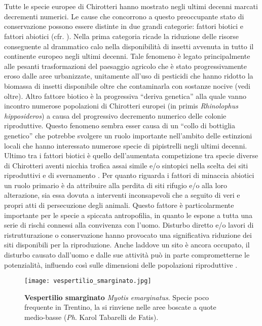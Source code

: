 \documentclass[10pt,twoside,openany,x11names,svgnames,italian,a5paper,dvipsnames,table]{memoir}
\newcommand{\ph}{\emph{Ph}. }
\begin{document}
\section*{}
Tutte le specie europee di Chirotteri hanno mostrato negli ultimi decenni marcati decrementi numerici. Le cause che concorrono a questo preoccupante stato di conservazione possono essere distinte in due grandi categorie: fattori biotici e fattori abiotici (cfr. \cite{Lanza} \cite{Kunz} \cite{Dietz}). Nella prima categoria ricade la riduzione delle risorse conseguente al drammatico calo nella disponibilità di insetti avvenuta in tutto il continente europeo negli ultimi decenni. Tale fenomeno è legato principalmente alle pesanti trasformazioni del paesaggio agricolo che è stato progressivamente eroso dalle aree urbanizzate, unitamente all’uso di pesticidi che hanno ridotto la biomassa di insetti disponibile oltre che contaminarla con sostanze nocive (vedi oltre). Altro fattore biotico è la progressiva “deriva genetica” alla quale vanno incontro numerose popolazioni di Chirotteri europei (in primis \emph{Rhinolophus hipposideros}) a causa del progressivo decremento numerico delle colonie riproduttive. Questo fenomeno sembra esser causa di un “collo di bottiglia genetico” che potrebbe svolgere un ruolo importante nell’ambito delle estinzioni locali che hanno interessato numerose specie di pipistrelli negli ultimi decenni. Ultimo tra i fattori biotici è quello dell’aumentata competizione tra specie diverse di Chirotteri aventi nicchia trofica assai simile e/o sintopici nella scelta dei siti riproduttivi e di svernamento \cite{Arlettaz}. Per quanto riguarda i fattori di minaccia abiotici un ruolo primario è da attribuire alla perdita di siti rifugio e/o alla loro alterazione, sia essa dovuta a interventi inconsapevoli che a seguito di veri e propri atti di persecuzione degli animali. Questo fattore è particolarmente importante per le specie a spiccata antropofilia, in quanto le espone a tutta una serie di rischi connessi alla convivenza con l’uomo. Disturbo diretto e/o lavori di ristrutturazione o conservazione hanno provocato una significativa riduzione dei siti disponibili per la riproduzione. Anche laddove un sito è ancora occupato, il disturbo causato dall’uomo e dalle sue attività può in parte comprometterne le potenzialità, influendo così sulle dimensioni delle popolazioni riproduttive \cite{GIRC08}.
\begin{wrapfigure}[17]{r}{.6\columnwidth}
\centering
  \texttt{[image: vespertilio\_smarginato.jpg]}
  \caption*{\textbf{Vespertilio smarginato} \emph{Myotis emarginatus}. Specie poco frequente in Trentino, la si rinviene nelle aree boscate a quote medio-basse (\ph Karol Tabarelli de Fatis).}
\end{wrapfigure}
\end{document}
